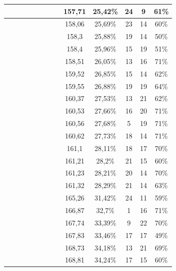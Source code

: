\begin{center}
\begin{longtable}{|c|c|c|c|c|c|c|c|c|c|c|c|c|}
 \x &  \x &  \x &  &  &  &  \x &  \x & 157,71 & 25,42\% & 24 & 9 & 61\% \\ \hline
 \x &  &  &  \x &  \x &  &  \x &  \x & 158,06 & 25,69\% & 23 & 14 & 60\% \\ \hline
 \x &  \x &  &  \x &  &  &  &  \x & 158,3 & 25,88\% & 19 & 14 & 50\% \\ \hline
 \x &  &  &  \x &  &  &  \x &  \x & 158,4 & 25,96\% & 15 & 19 & 51\% \\ \hline
 \x &  &  &  &  &  \x &  \x &  \x & 158,51 & 26,05\% & 13 & 16 & 71\% \\ \hline
 \x &  \x &  \x &  \x &  \x &  &  \x &  \x & 159,52 & 26,85\% & 15 & 14 & 62\% \\ \hline
 \x &  &  \x &  \x &  &  &  \x &  \x & 159,55 & 26,88\% & 19 & 19 & 64\% \\ \hline
 \x &  &  \x &  \x &  \x &  &  \x &  \x & 160,37 & 27,53\% & 13 & 21 & 62\% \\ \hline
 \x &  \x &  &  \x &  \x &  \x &  &  \x & 160,53 & 27,66\% & 16 & 20 & 71\% \\ \hline
 \x &  &  &  &  \x &  \x &  \x &  \x & 160,56 & 27,68\% & 5 & 19 & 71\% \\ \hline
 \x &  \x &  \x &  \x &  \x &  \x &  \x &  \x & 160,62 & 27,73\% & 18 & 14 & 71\% \\ \hline
 \x &  &  \x &  \x &  \x &  \x &  \x &  \x & 161,1 & 28,11\% & 18 & 17 & 70\% \\ \hline
 \x &  &  &  \x &  \x &  &  &  \x & 161,21 & 28,2\% & 21 & 15 & 60\% \\ \hline
 \x &  &  \x &  &  \x &  \x &  \x &  \x & 161,23 & 28,21\% & 20 & 14 & 70\% \\ \hline
 \x &  &  \x &  &  \x &  &  \x &  \x & 161,32 & 28,29\% & 21 & 14 & 63\% \\ \hline
 \x &  &  &  \x &  \x &  &  \x &  \x & 165,26 & 31,42\% & 24 & 11 & 59\% \\ \hline
 \x &  &  &  \x &  \x &  \x &  \x &  \x & 166,87 & 32,7\% & 1 & 16 & 71\% \\ \hline
 \x &  &  &  \x &  &  \x &  \x &  \x & 167,74 & 33,39\% & 9 & 22 & 70\% \\ \hline
 \x &  &  &  \x &  &  &  \x &  \x & 167,83 & 33,46\% & 17 & 17 & 49\% \\ \hline
 \x &  \x &  &  \x &  \x &  \x &  \x &  \x & 168,73 & 34,18\% & 13 & 21 & 69\% \\ \hline
 \x &  \x &  &  \x &  \x &  &  \x &  \x & 168,81 & 34,24\% & 17 & 15 & 60\% \\ \hline

\end{longtable}
\end{center}
